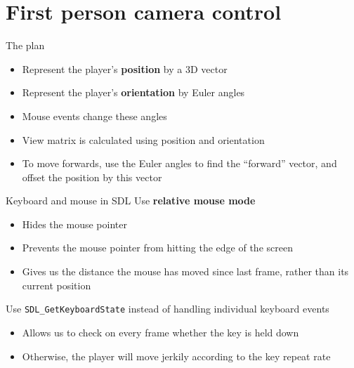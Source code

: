 \part{First person camera control}
\frame{\partpage}

\begin{frame}{The plan}
	\begin{itemize}
		\pause\item Represent the player's \textbf{position} by a 3D vector
		\pause\item Represent the player's \textbf{orientation} by Euler angles
		\pause\item Mouse events change these angles
		\pause\item View matrix is calculated using position and orientation
		\pause\item To move forwards, use the Euler angles to find the ``forward'' vector,
			and offset the position by this vector
	\end{itemize}
\end{frame}

\begin{frame}{Keyboard and mouse in SDL}
	\pause Use \textbf{relative mouse mode}
	\begin{itemize}
		\pause\item Hides the mouse pointer
		\pause\item Prevents the mouse pointer from hitting the edge of the screen
		\pause\item Gives us the distance the mouse has moved since last frame, rather than its current position
	\end{itemize}
	\pause Use \lstinline{SDL_GetKeyboardState} instead of handling individual keyboard events
	\begin{itemize}
		\pause\item Allows us to check on every frame whether the key is held down
		\pause\item Otherwise, the player will move jerkily according to the key repeat rate
	\end{itemize}
\end{frame}

